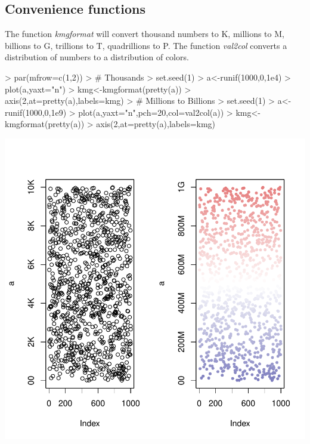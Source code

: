 \documentclass{article}
\begin{document}
\subsection{Convenience functions}
The function \emph{kmgformat} will convert thousand numbers to K, millions to M, billions to G, trillions to T, quadrillions to P. The function \emph{val2col} converts a distribution of numbers to a distribution of colors.
\begin{Schunk}
\begin{Sinput}
> par(mfrow=c(1,2))
> # Thousands
> set.seed(1)
> a<-runif(1000,0,1e4)
> plot(a,yaxt="n")
> kmg<-kmgformat(pretty(a))
> axis(2,at=pretty(a),labels=kmg)
> # Millions to Billions
> set.seed(1)
> a<-runif(1000,0,1e9)
> plot(a,yaxt="n",pch=20,col=val2col(a))
> kmg<-kmgformat(pretty(a))
> axis(2,at=pretty(a),labels=kmg)
\end{Sinput}
\end{Schunk}
\includegraphics{vulcan-014}
\end{document}
